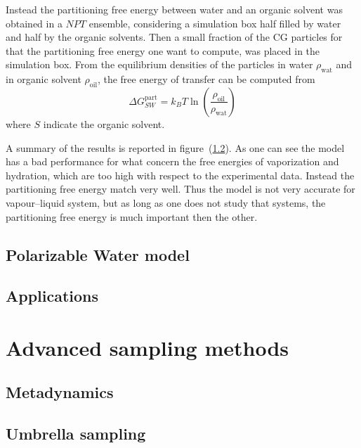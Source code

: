Instead the partitioning free energy between water and an organic solvent was obtained in a $NPT$ ensemble, considering a simulation box half filled by water and half by the organic solvents. Then a small fraction of the \ac{CG} particles for that the partitioning free energy one want to compute, was placed in the simulation box. From the equilibrium densities of the particles in water $\rho_{\text{wat}}$ and in organic solvent $\rho_{\text{oil}}$, the free energy of transfer can be computed from
\begin{equation*}
	\Delta G_{SW}^{\text{part}} = k_B T \ln \left ( \frac{\rho_{\text{oil}}}{\rho_{\text{wat}}}\right )
\end{equation*}
where $S$ indicate the organic solvent.

A summary of the results is reported in figure~(\ref{}). As one can see the model has a bad performance for what concern the free energies of vaporization and hydration, which are too high with respect to the experimental data. Instead the partitioning free energy match very well. Thus the model is not very accurate for vapour--liquid system, but as long as one does not study that systems, the partitioning free energy is much important then the other.

\subsection{Polarizable Water model}
\label{sec:pw}
\subsection{Applications}

\section{Advanced sampling methods}
	\subsection{Metadynamics}

	\subsection{Umbrella sampling} %
	
	
